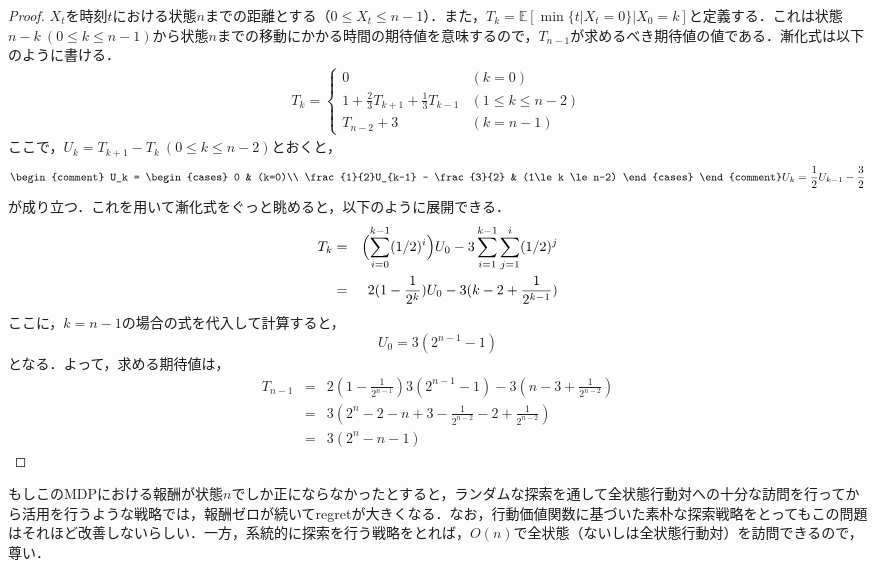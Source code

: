 \documentclass{jsarticle}
\begin{document}
\begin{proof}
$X_t$を時刻$t$における状態$n$までの距離とする（$0 \le X_t \le n-1$）．また，$T_{k} = \mathbb{E}[\min \{ t | X_t = 0 \} | X_0 = k]$と定義する．これは状態$n-k \ (0\le k \le n-1)$から状態$n$までの移動にかかる時間の期待値を意味するので，$T_{n-1}$が求めるべき期待値の値である．漸化式は以下のように書ける．
\begin{eqnarray*}
T_{k} = \begin{cases}
    0 & (k=0) \\
    1 + \frac{2}{3}T_{k+1} + \frac{1}{3}T_{k-1} & (1\le k \le n-2) \\
    T_{n-2} + 3 & (k = n-1)
  \end{cases}
\end{eqnarray*}
ここで，$U_k = T_{k+1} - T_{k}\  (0\le k \le n-2)$とおくと，
\begin{eqnarray*}
\begin{comment}
U_k = \begin{cases}
0 & (k=0)\\
\frac{1}{2}U_{k-1} - \frac{3}{2} & (1\le k \le n-2)
\end{cases}
\end{comment}
U_k = \frac{1}{2}U_{k-1} - \frac{3}{2}
\end{eqnarray*}
が成り立つ．これを用いて漸化式をぐっと眺めると，以下のように展開できる．
\begin{eqnarray*}
T_k &=& \Bigl(\sum_{i=0}^{k-1}(1/2)^i\Bigr)U_0 - 3 \sum_{i=1}^{k-1}\sum_{j=1}^i (1/2)^j\\
&=& 2(1-\frac{1}{2^k})U_0 - 3(k-2+\frac{1}{2^{k-1}})
\end{eqnarray*}
ここに，$k=n-1$の場合の式を代入して計算すると，
\[U_0 = 3(2^{n-1}-1)
\]
となる．よって，求める期待値は，
\begin{eqnarray*}
T_{n-1} &=& 2(1-\frac{1}{2^{n-1}})  3(2^{n-1}-1) - 3(n-3+\frac{1}{2^{n-2}})
\\
&=& 3(2^n-2-n+3-\frac{1}{2^{n-2}}-2+\frac{1}{2^{n-2}})\\
&=& 3(2^n-n-1)
\end{eqnarray*}
\end{proof}
もしこのMDPにおける報酬が状態$n$でしか正にならなかったとすると，ランダムな探索を通して全状態行動対への十分な訪問を行ってから活用を行うような戦略では，報酬ゼロが続いてregretが大きくなる．なお，行動価値関数に基づいた素朴な探索戦略をとってもこの問題はそれほど改善しないらしい．一方，系統的に探索を行う戦略をとれば，$O(n)$で全状態（ないしは全状態行動対）を訪問できるので，尊い．
\end{document}
